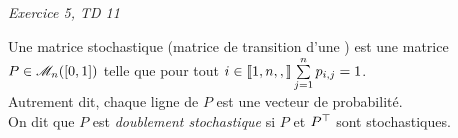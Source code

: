 \emph{Exercice 5, TD 11}

\begin{tcolorbox}
    Une matrice stochastique (matrice de transition d'une ) est une matrice $P \in \mathscr{M}_n([0, 1])$ telle que pour tout $i \in \llbracket 1,n , , \rrbracket \sum\limits_{j=1}^{n} p_{i,j} = 1$. \\ Autrement dit, chaque ligne de $P$ est une vecteur de probabilité. \\
    On dit que $P$ est \emph{doublement stochastique} si $P$ et $P^\top$ sont stochastiques.
\end{tcolorbox}

%    

